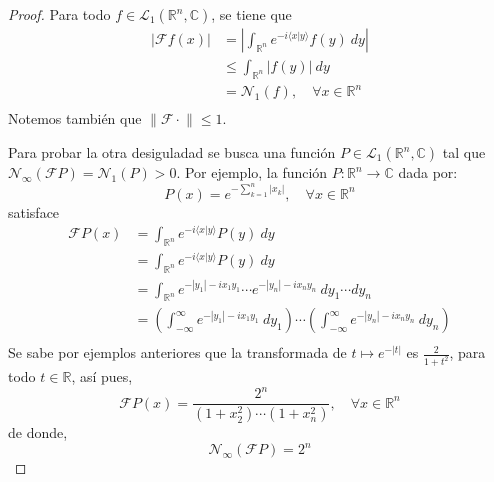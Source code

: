 \documentclass[12pt]{report}
\theoremstyle{largebreak}
\renewcommand{\leq}{\ensuremath{\leqslant}}
\newcommand\abs[1]{\ensuremath{\left|#1\right|}}
\newcommand\cf[3]{\ensuremath{#1:#2\rightarrow#3}}
\newcommand\norm[1]{\ensuremath{\|#1\|}}
\newcommand\pint[2]{\ensuremath{\langle#1| #2\rangle}}
\newcommand{\N}[2]{\ensuremath{\mathcal{N}_{#1}\left(#2\right)}}
\newcommand{\fou}[1]{\ensuremath{\mathcal{F}#1}}
\begin{document}
    \begin{proof}
        Para todo $f\in\mathcal{L}_1(\mathbb{R}^n,\mathbb{C})$, se tiene que
        \begin{equation*}
            \begin{split}
                \abs{\fou{f}(x)}&=\abs{\int_{\mathbb{R}^n}e^{ -i\pint{x}{y}}f(y)\:dy}\\
                &\leq\int_{\mathbb{R}^n}\abs{f(y)}\:dy\\
                &=\N{1}{f},\quad\forall x\in\mathbb{R}^n \\
            \end{split}
        \end{equation*}
        Notemos también que $\norm{\fou{\cdot}}\leq1$.

        Para probar la otra desiguladad se busca una función $P\in\mathcal{L}_1(\mathbb{R}^n,\mathbb{C})$ tal que $\N{\infty}{\fou{P}}=\N{1}{P}>0$. Por ejemplo, la función $\cf{P}{\mathbb{R}^n}{\mathbb{C}}$ dada por:
        \begin{equation*}
            P(x)=e^{ -\sum_{ k=1}^n\abs{x_k}},\quad\forall x\in\mathbb{R}^n
        \end{equation*}
        satisface
        \begin{equation*}
            \begin{split}
                \fou{P}(x)&=\int_{\mathbb{R}^n}e^{ -i\pint{x}{y}}P(y)\:dy\\
                &=\int_{\mathbb{R}^n}e^{ -i\pint{x}{y}}P(y)\:dy\\
                &=\int_{\mathbb{R}^n}e^{ -\abs{y_1}-ix_1y_1}\cdots e^{ -\abs{y_n}-ix_ny_n}\:dy_1\cdots dy_n\\
                &=\left(\int_{-\infty}^{\infty}e^{ -\abs{y_1}-ix_1y_1}\:dy_1\right)\cdots\left(\int_{-\infty}^{\infty}e^{ -\abs{y_n}-ix_ny_n}\:dy_n\right)\\
            \end{split}
        \end{equation*}
        Se sabe por ejemplos anteriores que la transformada de $t\mapsto e^{-\abs{t}}$ es $\frac{2}{1+t^2}$, para todo $t\in\mathbb{R}$, así pues,
        \begin{equation*}
            \fou{P}(x)=\frac{2^n}{(1+x_2^2)\cdots(1+x_n^2)},\quad\forall x\in\mathbb{R}^n
        \end{equation*}
        de donde,
        \begin{equation*}
            \N{\infty}{\fou{P}}=2^n
        \end{equation*}

\end{proof}
\end{document}
